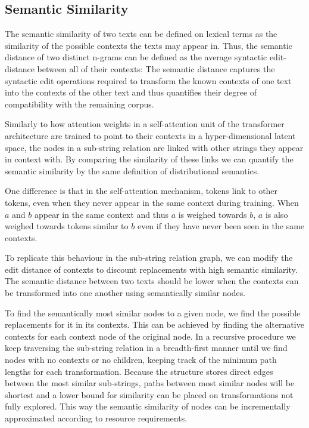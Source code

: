 \subsection{Semantic Similarity}
The semantic similarity of two texts can be defined on lexical terms as the similarity of the possible contexts the texts may appear in. Thus, the semantic distance of two distinct n-grams can be defined as the average syntactic edit-distance between all of their contexts:
\noindent
The semantic distance captures the syntactic edit operations required to
transform the known contexts of one text into the contexts of the other text and
thus quantifies their degree of compatibility with the remaining corpus.

\noindent
Similarly to how attention weights in a self-attention unit of the transformer architecture are trained to point to their contexts in a hyper-dimensional latent space, the nodes in a sub-string relation are linked with other strings they appear in context with. By comparing the similarity of these links we can quantify the semantic similarity by the same definition of distributional semantics.

\noindent
One difference is that in the self-attention mechanism, tokens link to other tokens, even when they never appear in the same context during training. When $a$ and $b$ appear in the same context and thus $a$ is weighed towards $b$, $a$ is also weighed towards tokens similar to $b$ even if they have never been seen in the same contexts.

\noindent
To replicate this behaviour in the sub-string relation graph, we can modify the edit distance of contexts to discount replacements with high semantic similarity. The semantic distance between two texts should be lower when the contexts can be transformed into one another using semantically similar nodes.

\noindent
To find the semantically most similar nodes to a given node, we find the possible replacements for it in its contexts. This can be achieved by finding the alternative contexts for each context node of the original node. In a recursive procedure we keep traversing the sub-string relation in a breadth-first manner until we find nodes with no contexts or no children, keeping track of the minimum path lengths for each transformation. Because the structure stores direct edges between the most similar sub-strings, paths between most similar nodes will be shortest and a lower bound for similarity can be placed on transformations not fully explored. This way the semantic similarity of nodes can be incrementally approximated according to resource requirements.

